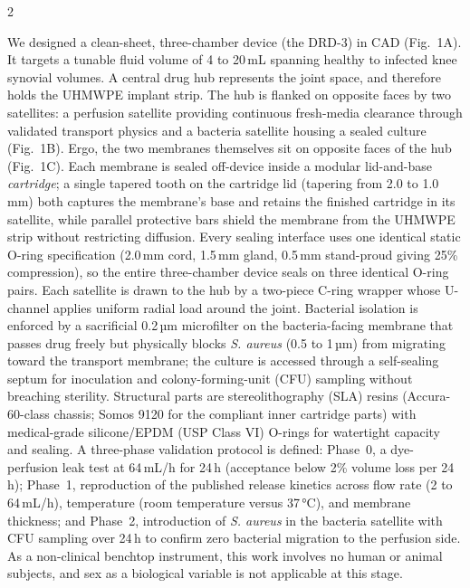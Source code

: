 \documentclass[8pt]{extarticle}
\newcommand{\osec}[1]{\par\vspace{0.5pt}\noindent{\bfseries\color{tealc}#1.}\hspace{0.6em}\ignorespaces}
\begin{document}
\begin{multicols}{2}
\osec{Methods}
We designed a clean-sheet, three-chamber device (the DRD-3) in CAD (Fig.~1A). It targets a tunable fluid volume of
4 to 20\,mL spanning healthy to infected knee synovial volumes. A central drug hub
represents the joint space, and therefore holds the UHMWPE implant strip.  The hub is flanked on opposite faces
by two satellites: a perfusion satellite providing continuous fresh-media clearance through validated
transport physics and a bacteria satellite housing a sealed culture (Fig.~1B). Ergo, the two
membranes themselves sit on opposite faces of the hub (Fig.~1C). Each membrane is sealed off-device inside a modular lid-and-base \textit{cartridge}; a
single tapered tooth on the cartridge lid (tapering from 2.0 to 1.0\,mm) both captures the membrane's base and retains
the finished cartridge in its satellite, while parallel protective bars shield the membrane from the
UHMWPE strip without restricting diffusion. Every sealing interface uses one identical static O-ring
specification (2.0\,mm cord, 1.5\,mm gland, 0.5\,mm stand-proud giving 25\% compression), so the
entire three-chamber device seals on three identical O-ring pairs. Each satellite is drawn to the hub
by a two-piece C-ring wrapper whose U-channel applies uniform radial load around the joint. Bacterial isolation is enforced by a sacrificial
0.2\,µm microfilter on the bacteria-facing membrane that passes drug freely but physically blocks
\emph{S. aureus} (0.5 to 1\,µm) from migrating toward the transport membrane; the culture is accessed
through a self-sealing septum for inoculation and colony-forming-unit (CFU) sampling without breaching
sterility. Structural parts are stereolithography (SLA) resins (Accura-60-class chassis; Somos 9120
for the compliant inner cartridge parts) with medical-grade silicone/EPDM (USP Class VI) O-rings for watertight capacity and sealing. A
three-phase validation protocol is defined: Phase~0, a dye-perfusion leak test at 64\,mL/h for 24\,h
(acceptance below 2\% volume loss per 24\,h); Phase~1, reproduction of the published release kinetics
across flow rate (2 to 64\,mL/h), temperature (room temperature versus 37\,°C), and membrane
thickness; and Phase~2, introduction of \emph{S. aureus} in the bacteria satellite with CFU sampling
over 24\,h to confirm zero bacterial migration to the perfusion side. As a non-clinical benchtop
instrument, this work involves no human or animal subjects, and sex as a biological variable is not
applicable at this stage.


\end{multicols}
\end{document}
